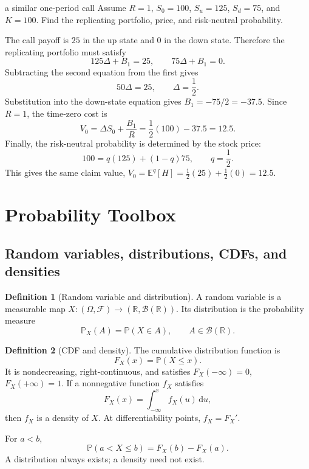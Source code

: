 \documentclass[10pt]{article}
\newcommand{\E}{\mathbb E}
\newcommand{\Pbb}{\mathbb P}
\newcommand{\R}{\mathbb R}
\newcommand{\1}{\mathbf 1}
\newcommand{\cF}{\mathcal F}
\newcommand{\dd}{\,\mathrm d}
\theoremstyle{definition}
\newtheorem{definition}{Definition}[section]
\begin{document}
\begin{studentexercise}{a similar one-period call}
Assume $R=1$, $S_0=100$, $S_u=125$, $S_d=75$, and $K=100$.
Find the replicating portfolio, price, and risk-neutral probability.
\end{studentexercise}
\begin{shortsolution}
The call payoff is $25$ in the up state and $0$ in the down state. Therefore
the replicating portfolio must satisfy
\[
125\Delta+B_1=25,
\qquad
75\Delta+B_1=0.
\]
Subtracting the second equation from the first gives
\[
50\Delta=25,
\qquad \Delta=\frac12.
\]
Substitution into the down-state equation gives
$B_1=-75/2=-37.5$. Since $R=1$, the time-zero cost is
\[
V_0=\Delta S_0+\frac{B_1}{R}
=\frac12(100)-37.5=12.5.
\]
Finally, the risk-neutral probability is determined by the stock price:
\[
100=q(125)+(1-q)75,
\qquad q=\frac12.
\]
This gives the same claim value,
$V_0=\E^q[H]=\frac12(25)+\frac12(0)=12.5$.
\end{shortsolution}

\section{Probability Toolbox}

\subsection{Random variables, distributions, CDFs, and densities}

\begin{definition}[Random variable and distribution]
A random variable is a measurable map $X:(\Omega,\cF)\to(\R,\mathcal B(\R))$.
Its distribution is the probability measure
\[
\Pbb_X(A)=\Pbb(X\in A),\qquad A\in\mathcal B(\R).
\]
\end{definition}

\begin{definition}[CDF and density]
The cumulative distribution function is
\[
F_X(x)=\Pbb(X\le x).
\]
It is nondecreasing, right-continuous, and satisfies
$F_X(-\infty)=0$, $F_X(+\infty)=1$. If a nonnegative function $f_X$ satisfies
\[
F_X(x)=\int_{-\infty}^x f_X(u)\dd u,
\]
then $f_X$ is a density of $X$. At differentiability points, $f_X=F_X'$.
\end{definition}

For $a<b$,
\[
\Pbb(a<X\le b)=F_X(b)-F_X(a).
\]
A distribution always exists; a density need not exist.
\end{document}
